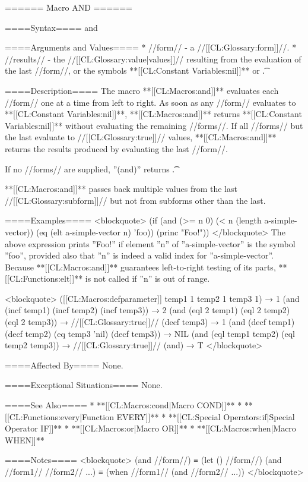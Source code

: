 ====== Macro AND ======

====Syntax====
\DefmacWithValues and {} {}

====Arguments and Values====
  * //form// - a //[[CL:Glossary:form]]//.
  * //results// - the //[[CL:Glossary:value|values]]// resulting from the evaluation of the last //form//, or the symbols **[[CL:Constant Variables:nil]]** or \t.

====Description====
The macro **[[CL:Macros:and]]** evaluates each //form// one at a time from left to right. As soon as any //form// evaluates to **[[CL:Constant Variables:nil]]**, **[[CL:Macros:and]]** returns **[[CL:Constant Variables:nil]]** without evaluating the remaining //forms//. If all //forms// but the last evaluate to //[[CL:Glossary:true]]// values, **[[CL:Macros:and]]** returns the results produced by evaluating the last //form//.

If no //forms// are supplied, ''(and)'' returns \t.

**[[CL:Macros:and]]** passes back multiple values from the last //[[CL:Glossary:subform]]// but not from subforms other than the last.

====Examples====
<blockquote> (if (and (>= n 0) (< n (length a-simple-vector)) (eq (elt a-simple-vector n) 'foo)) (princ "Foo!")) </blockquote> The above expression prints ''Foo!'' if element ''n'' of ''a-simple-vector'' is the symbol ''foo'', provided also that ''n'' is indeed a valid index for ''a-simple-vector''. Because **[[CL:Macros:and]]** guarantees left-to-right testing of its parts, **[[CL:Functions:elt]]** is not called if ''n'' is out of range.

<blockquote> ([[CL:Macros:defparameter]] temp1 1 temp2 1 temp3 1) → 1 (and (incf temp1) (incf temp2) (incf temp3)) → 2 (and (eql 2 temp1) (eql 2 temp2) (eql 2 temp3)) → //[[CL:Glossary:true]]// (decf temp3) → 1 (and (decf temp1) (decf temp2) (eq temp3 'nil) (decf temp3)) → NIL (and (eql temp1 temp2) (eql temp2 temp3)) → //[[CL:Glossary:true]]// (and) → T </blockquote>

====Affected By====
None.

====Exceptional Situations====
None.

====See Also====
  * **[[CL:Macros:cond|Macro COND]]**
  * **[[CL:Functions:every|Function EVERY]]**
  * **[[CL:Special Operators:if|Special Operator IF]]**
  * **[[CL:Macros:or|Macro OR]]**
  * **[[CL:Macros:when|Macro WHEN]]**

====Notes====
<blockquote> (and //form//) ≡ (let () //form//) (and //form1// //form2// ...) ≡ (when //form1// (and //form2// ...)) </blockquote>

